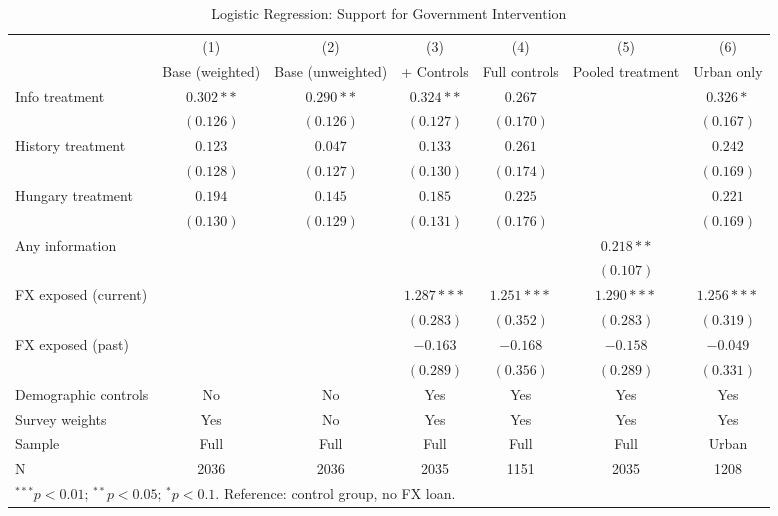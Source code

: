 \begin{table}[htbp]
\centering
\caption{Logistic Regression: Support for Government Intervention}
\label{tab:robustness}
\small
\begin{tabular}{lcccccc}
\toprule
 & (1) & (2) & (3) & (4) & (5) & (6) \\
 & \scriptsize Base (weighted) & \scriptsize Base (unweighted) & \scriptsize + Controls & \scriptsize Full controls & \scriptsize Pooled treatment & \scriptsize Urban only \\
\midrule
Info treatment & $0.302**$ & $0.290**$ & $0.324**$ & $0.267$ &  & $0.326*$ \\
 & $(0.126)$ & $(0.126)$ & $(0.127)$ & $(0.170)$ &  & $(0.167)$ \\[0.3em]
History treatment & $0.123$ & $0.047$ & $0.133$ & $0.261$ &  & $0.242$ \\
 & $(0.128)$ & $(0.127)$ & $(0.130)$ & $(0.174)$ &  & $(0.169)$ \\[0.3em]
Hungary treatment & $0.194$ & $0.145$ & $0.185$ & $0.225$ &  & $0.221$ \\
 & $(0.130)$ & $(0.129)$ & $(0.131)$ & $(0.176)$ &  & $(0.169)$ \\[0.3em]
Any information &  &  &  &  & $0.218**$ &  \\
 &  &  &  &  & $(0.107)$ &  \\[0.3em]
FX exposed (current) &  &  & $1.287***$ & $1.251***$ & $1.290***$ & $1.256***$ \\
 &  &  & $(0.283)$ & $(0.352)$ & $(0.283)$ & $(0.319)$ \\[0.3em]
FX exposed (past) &  &  & $-0.163$ & $-0.168$ & $-0.158$ & $-0.049$ \\
 &  &  & $(0.289)$ & $(0.356)$ & $(0.289)$ & $(0.331)$ \\[0.3em]
\midrule
Demographic controls & No & No & Yes & Yes & Yes & Yes \\
Survey weights & Yes & No & Yes & Yes & Yes & Yes \\
Sample & Full & Full & Full & Full & Full & Urban \\
N & 2036 & 2036 & 2035 & 1151 & 2035 & 1208 \\
\bottomrule
\multicolumn{7}{l}{\scriptsize $^{***}p<0.01$; $^{**}p<0.05$; $^{*}p<0.1$. Reference: control group, no FX loan.} \\
\end{tabular}
\end{table}